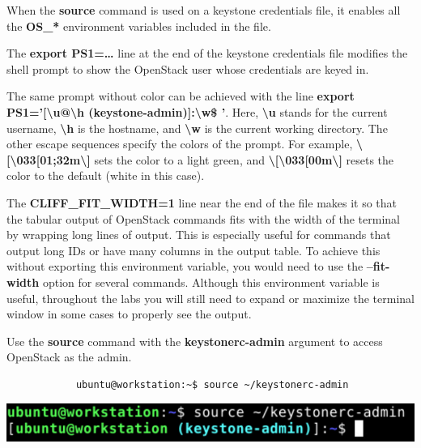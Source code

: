\documentclass[letterpaper, 12pt]{article}
\begin{document}
\begin{enumerate}
    \begin{notebox}
        When the \textbf{source} command is used on a keystone credentials file, it enables all the \textbf{OS\_*} environment variables included in the file.
    \end{notebox}
    \begin{notebox}
        The \textbf{export PS1=…} line at the end of the keystone credentials file modifies the shell prompt to show the OpenStack user whose credentials are keyed in.
    \end{notebox}
    \begin{notebox}
        The same prompt without color can be achieved with the line \textbf{export PS1='[\textbackslash u@\textbackslash h (keystone-admin)]:\textbackslash w\$ '}.
        Here, \textbf{\textbackslash u} stands for the current username, \textbf{\textbackslash h} is the hostname, and \textbf{\textbackslash w} is the current working directory.
        The other escape sequences specify the colors of the prompt.
        For example, \textbf{\textbackslash[\textbackslash 033[01;32m\textbackslash]} sets the color to a light green, and \textbf{\textbackslash[\textbackslash 033[00m\textbackslash]} resets the color to the default (white in this case).
    \end{notebox}
    \begin{notebox}
        The \textbf{CLIFF\_FIT\_WIDTH=1} line near the end of the file makes it so that the tabular output of OpenStack commands fits with the width of the terminal by wrapping long lines of output.
        This is especially useful for commands that output long IDs or have many columns in the output table.
        To achieve this without exporting this environment variable, you would need to use the \textbf{--fit-width} option for several commands.
        Although this environment variable is useful, throughout the labs you will still need to expand or maximize the terminal window in some cases to properly see the output.
    \end{notebox}


    \begin{labstep}
        Use the \textbf{source} command with the \textbf{keystonerc-admin} argument to access OpenStack as the admin.
        \begin{lstlisting}
            ubuntu@workstation:~$ source ~/keystonerc-admin
        \end{lstlisting}

        \begin{center}
            \includegraphics[width=\linewidth]{images/part2/step3.png}
        \end{center}
    \end{labstep}


\end{enumerate}
\end{document}
